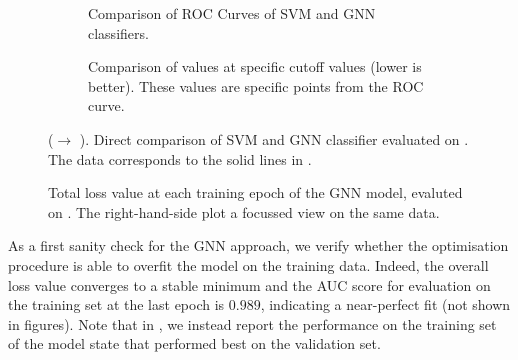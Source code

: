 \documentclass[
	fontsize=10pt, %
	twoside=false, %
	secnumdepth=1, %
  toc=indentunnumbered %
]{kaobook}
\begin{document}





\begin{figure}[h]
  \centering
  \begin{subfigure}[h]{0.49\linewidth}
    \caption{Comparison of ROC Curves of SVM and GNN classifiers.}
  \end{subfigure}
  \begin{subfigure}[h]{0.49\linewidth}
    \caption{Comparison of \FPR values at specific \TPR cutoff values (lower is better). These
      values are specific points from the ROC curve.}
  \end{subfigure}
  \caption{(\ADMap $\rightarrow$ \ReconMap).
    Direct comparison of SVM and GNN classifier evaluated on \ReconMap. The data
    corresponds to the solid lines in .}
  \label{fig:svm-repro-reconmapolder-roc-train-test}
\end{figure}
\begin{figure}[h]
  \centering
  \begin{subfigure}[h]{0.49\linewidth}
  \end{subfigure}
  \begin{subfigure}[h]{0.49\linewidth}
  \end{subfigure}
  \caption{Total loss value at each training epoch of the GNN model, evaluted on
    \ReconMap. The right-hand-side plot a focussed view on the same data.}
  \label{fig:svm-repro-reconmapolder-loss}
\end{figure}


As a first sanity check for the GNN approach, we verify whether the optimisation
procedure is able to overfit the model on the training data. Indeed, the overall
loss value converges to a stable minimum and the AUC score for evaluation on the
training set at the last epoch is $0.989$, indicating a near-perfect fit (not
shown in figures). Note that in , we instead report
the performance on the training set of the model state that performed best on
the validation set.
\end{document}
